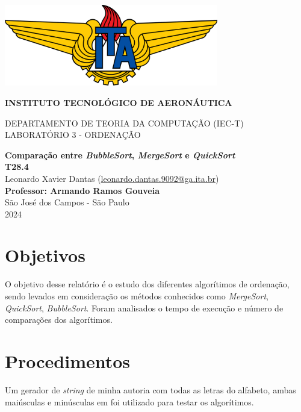\documentclass[12pt,a4paper,oneside]{article}
\begin{document}
\begin{center}

\includegraphics[width=0.7\textwidth]{Ita-logo.png}

{\Large \bf INSTITUTO TECNOLÓGICO DE AERONÁUTICA}

{\Large DEPARTAMENTO DE TEORIA DA COMPUTAÇÃO (IEC-T)}\\
{LABORATÓRIO 3 - ORDENAÇÃO}\\[2.0cm]

\vspace{1cm}

{\bf \large Comparação entre \textit{BubbleSort}, \textit{MergeSort} e \textit{QuickSort}}\\[2.5cm]

{\textbf{T28.4}\\
Leonardo Xavier Dantas (\href{mailto:leonardo.dantas.9092@ga.ita.br}{leonardo.dantas.9092@ga.ita.br})
}\\[2.0cm]

{\bf Professor: Armando Ramos Gouveia}\\[2.5cm]

{\large São José dos Campos - São Paulo}\\[0.2cm]
2024

\end{center}

\newpage

\section{Objetivos}

\quad O objetivo desse relatório é o estudo dos diferentes algorítimos de ordenação, sendo levados em consideração os métodos conhecidos como \textit{MergeSort}, \textit{QuickSort}, \textit{BubbleSort}. Foram analisados o tempo de execução e número de comparações dos algorítimos. 

\section{Procedimentos}

\quad Um gerador de \textit{string} de minha autoria com todas as letras do alfabeto, ambas maiúsculas e minúsculas em foi utilizado para testar os algorítimos.
\end{document}
